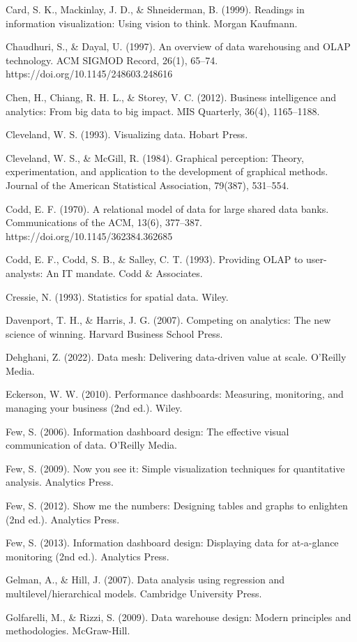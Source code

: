 Card, S. K., Mackinlay, J. D., \& Shneiderman, B. (1999). Readings in information visualization: Using vision to think. Morgan Kaufmann.

Chaudhuri, S., \& Dayal, U. (1997). An overview of data warehousing and OLAP technology. ACM SIGMOD Record, 26(1), 65–74. https://doi.org/10.1145/248603.248616

Chen, H., Chiang, R. H. L., \& Storey, V. C. (2012). Business intelligence and analytics: From big data to big impact. MIS Quarterly, 36(4), 1165–1188.

Cleveland, W. S. (1993). Visualizing data. Hobart Press.

Cleveland, W. S., \& McGill, R. (1984). Graphical perception: Theory, experimentation, and application to the development of graphical methods. Journal of the American Statistical Association, 79(387), 531–554.

Codd, E. F. (1970). A relational model of data for large shared data banks. Communications of the ACM, 13(6), 377–387. https://doi.org/10.1145/362384.362685

Codd, E. F., Codd, S. B., \& Salley, C. T. (1993). Providing OLAP to user-analysts: An IT mandate. Codd \& Associates.

Cressie, N. (1993). Statistics for spatial data. Wiley.

Davenport, T. H., \& Harris, J. G. (2007). Competing on analytics: The new science of winning. Harvard Business School Press.

Dehghani, Z. (2022). Data mesh: Delivering data-driven value at scale. O’Reilly Media.

Eckerson, W. W. (2010). Performance dashboards: Measuring, monitoring, and managing your business (2nd ed.). Wiley.

Few, S. (2006). Information dashboard design: The effective visual communication of data. O’Reilly Media.

Few, S. (2009). Now you see it: Simple visualization techniques for quantitative analysis. Analytics Press.

Few, S. (2012). Show me the numbers: Designing tables and graphs to enlighten (2nd ed.). Analytics Press.

Few, S. (2013). Information dashboard design: Displaying data for at-a-glance monitoring (2nd ed.). Analytics Press.

Gelman, A., \& Hill, J. (2007). Data analysis using regression and multilevel/hierarchical models. Cambridge University Press.

Golfarelli, M., \& Rizzi, S. (2009). Data warehouse design: Modern principles and methodologies. McGraw-Hill.

